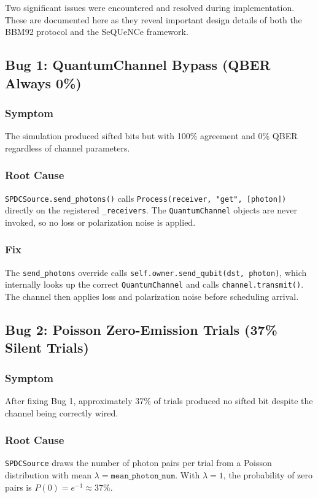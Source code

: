 \documentclass[12pt,oneside,letterpaper,english]{article}
\begin{document}
Two significant issues were encountered and resolved during implementation. These are documented here as they reveal important design details of both the BBM92 protocol and the SeQUeNCe framework.

\subsection{Bug 1: QuantumChannel Bypass (QBER Always 0\%)}

\subsubsection{Symptom}
The simulation produced sifted bits but with 100\% agreement and 0\% QBER regardless of channel parameters.

\subsubsection{Root Cause}
\texttt{SPDCSource.send\_photons()} calls \texttt{Process(receiver, "get", [photon])} directly on the registered \texttt{\_receivers}. The \texttt{QuantumChannel} objects are never invoked, so no loss or polarization noise is applied.

\subsubsection{Fix}
The \texttt{send\_photons} override calls \texttt{self.owner.send\_qubit(dst, photon)}, which internally looks up the correct \texttt{QuantumChannel} and calls \texttt{channel.transmit()}. The channel then applies loss and polarization noise before scheduling arrival.

\subsection{Bug 2: Poisson Zero-Emission Trials (37\% Silent Trials)}

\subsubsection{Symptom}
After fixing Bug 1, approximately 37\% of trials produced no sifted bit despite the channel being correctly wired.

\subsubsection{Root Cause}
\texttt{SPDCSource} draws the number of photon pairs per trial from a Poisson distribution with mean $\lambda = \texttt{mean\_photon\_num}$. With $\lambda = 1$, the probability of zero pairs is $P(0) = e^{-1} \approx 37\%$.
\end{document}
